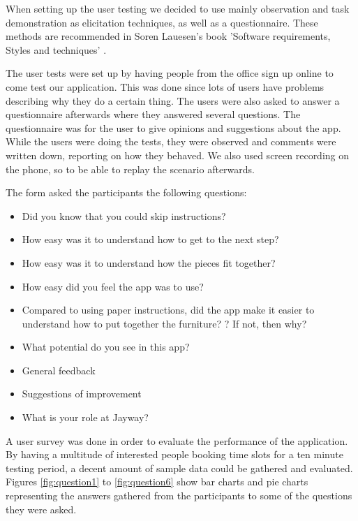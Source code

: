 When setting up the user testing we decided to use mainly observation and
task demonstration as elicitation techniques, as well as a questionnaire.
These methods are recommended in Soren Lauesen's book 'Software requirements, Styles and techniques' \cite{elicitation}.

The user tests were set up by having people from the office sign up online to come test our 
application. This was done since lots of users have problems describing why they do a certain thing.
The users were also asked to answer a questionnaire afterwards where they answered several
questions. The questionnaire was for the user to give opinions and suggestions about the app.
While the users were doing the tests, they were observed and comments were 
written down, reporting on how they behaved. We also used screen recording on the phone, so to be able to replay the scenario afterwards.

The form asked the participants the following questions:
\begin{itemize}
\item Did you know that you could skip instructions?
\item How easy was it to understand how to get to the next step?
\item How easy was it to understand how the pieces fit together?
\item How easy did you feel the app was to use?
\item Compared to using paper instructions, did the app make it easier to understand how to put together the furniture? ? If not, then why?
\item What potential do you see in this app?
\item General feedback
\item Suggestions of improvement
\item What is your role at Jayway?
\end{itemize}

A user survey was done in order to evaluate the performance of the application. By having a multitude of interested people booking time slots for a ten minute testing period, a decent amount of sample data could be gathered and evaluated. Figures \ref{fig:question1} to \ref{fig:question6} show bar charts and pie charts representing the answers gathered from the participants to some of the questions they were asked. 

